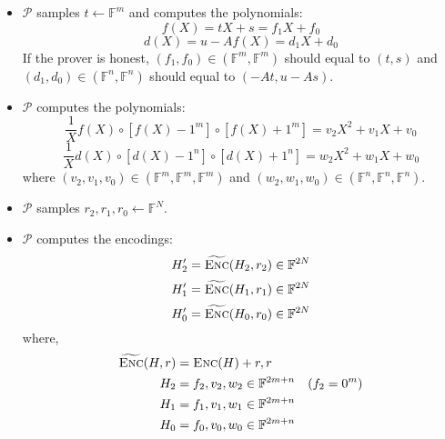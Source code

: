 \begin{itemize}
    \item $\mathcal{P}$ samples $t \leftarrow \mathbb{F}^{m}$ and computes the polynomials:
\begin{equation}
\label{eq:lwe3}
    f(X) = tX+s = f_1 X + f_0
\end{equation}
\begin{equation}
\label{eq:lwe4}
    d(X)=u-Af(X) = d_1 X + d_0
\end{equation}
If the prover is honest, $(f_1, f_0) \in (\mathbb{F}^m, \mathbb{F}^m)$ should equal to $(t, s)$ and $(d_1, d_0) \in (\mathbb{F}^n, \mathbb{F}^n)$ should equal to $(-At, u-As)$.

    \item $\mathcal{P}$ computes the polynomials:
\begin{equation}
\label{eq:lwe1}
    \frac{1}{X} f(X) \circ [f(X) - 1^m] \circ [f(X) + 1^m] = v_2X^2 + v_1X + v_0
\end{equation}
\begin{equation}
\label{eq:lwe2}
    \frac{1}{X} d(X) \circ [d(X) - 1^n] \circ [d(X) + 1^n] = w_2X^2 + w_1X + w_0
\end{equation}
where $(v_2, v_1, v_0) \in (\mathbb{F}^m, \mathbb{F}^m, \mathbb{F}^m)$ and $(w_2, w_1, w_0) \in (\mathbb{F}^n, \mathbb{F}^n, \mathbb{F}^n)$.

    \item $\mathcal{P}$ samples $r_2, r_1, r_0 \leftarrow \mathbb{F}^N$.


    \item $\mathcal{P}$ computes the encodings:
\begin{equation*}
    H_2^\prime = \widetilde{\textsc{Enc}}(H_2, r_2) \in \mathbb{F}^{2N}
\end{equation*}
\begin{equation*}
    H_1^\prime = \widetilde{\textsc{Enc}}(H_1, r_1) \in \mathbb{F}^{2N}
\end{equation*}
\begin{equation*}
    H_0^\prime = \widetilde{\textsc{Enc}}(H_0, r_0) \in \mathbb{F}^{2N}
\end{equation*}
where, 
\begin{align*}
    \widetilde{\textsc{Enc}}(H, r) &= \textsc{Enc}(H) + r, r \\ 
    H_2 &= f_2, v_2, w_2
    \in \mathbb{F}^{2m+n} \quad (f_2 = 0^m) \\
    H_1 &= f_1, v_1, w_1
    \in \mathbb{F}^{2m+n} \\
    H_0 &= f_0, v_0, w_0
    \in \mathbb{F}^{2m+n}
\end{align*}


\end{itemize}

